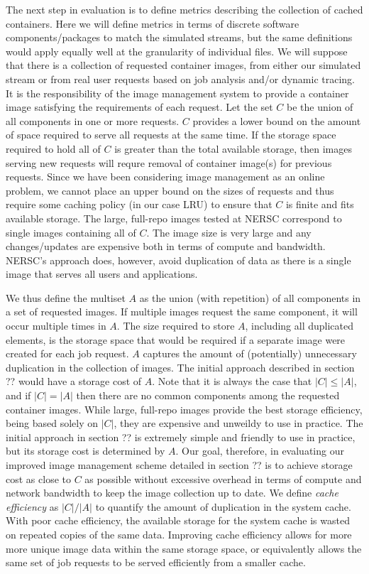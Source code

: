 \documentclass[sigconf]{acmart}
\begin{document}
The next step in evaluation is to define metrics describing the collection of cached containers.
Here we will define metrics in terms of discrete software components/packages to match the simulated streams,
but the same definitions would apply equally well at the granularity of individual files.
We will suppose that there is a collection of requested container images,
from either our simulated stream or from real user requests based on job analysis and/or dynamic tracing.
It is the responsibility of the image management system to provide a container image satisfying the requirements of each request.
Let the set $C$ be the union of all components in one or more requests.
$C$ provides a lower bound on the amount of space required to serve all requests at the same time.
If the storage space required to hold all of $C$ is greater than the total available storage,
then images serving new requests will requre removal of container image(s) for previous requests.
Since we have been considering image management as an online problem,
we cannot place an upper bound on the sizes of requests and thus require some caching policy
(in our case LRU) to ensure that $C$ is finite and fits available storage.
The large, full-repo images tested at NERSC correspond to single images containing all of $C$.
The image size is very large and any changes/updates are expensive both in terms of compute and bandwidth.
NERSC's approach does, however,
avoid duplication of data as there is a single image that serves all users and applications.

We thus define the multiset $A$ as the union (with repetition) of all components in a set of requested images.
If multiple images request the same component,
it will occur multiple times in $A$.
The size required to store $A$,
including all duplicated elements,
is the storage space that would be required if a separate image were created for each job request.
$A$ captures the amount of (potentially) unnecessary duplication in the collection of images.
The initial approach described in section ?? would have a storage cost of $A$.
Note that it is always the case that $|C| \leq |A|$,
and if $|C| = |A|$ then there are no common components among the requested container images.
While large, full-repo images provide the best storage efficiency, being based solely on $|C|$,
they are expensive and unweildy to use in practice.
The initial approach in section ?? is extremely simple and friendly to use in practice,
but its storage cost is determined by $A$.
Our goal, therefore, in evaluating our improved image management scheme detailed in section ?? is to achieve storage cost as close to $C$ as possible without excessive overhead in terms of compute and network bandwidth to keep the image collection up to date.
We define \emph{cache efficiency} as $|C| / |A|$ to quantify the amount of duplication in the system cache.
With poor cache efficiency,
the available storage for the system cache is wasted on repeated copies of the same data.
Improving cache efficiency allows for more more unique image data within the same storage space,
or equivalently allows the same set of job requests to be served efficiently from a smaller cache.
\end{document}
